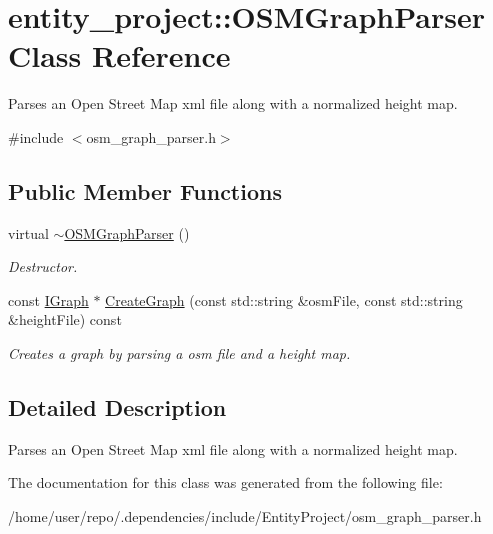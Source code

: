 \hypertarget{classentity__project_1_1OSMGraphParser}{}\section{entity\+\_\+project\+:\+:O\+S\+M\+Graph\+Parser Class Reference}
\label{classentity__project_1_1OSMGraphParser}


Parses an Open Street Map xml file along with a normalized height map.  




{\ttfamily \#include $<$osm\+\_\+graph\+\_\+parser.\+h$>$}

\subsection*{Public Member Functions}
\begin{DoxyCompactItemize}
\item 
\mbox{\label{classentity__project_1_1OSMGraphParser_a519d54d311ace383d8a75b285237cf4d}} 
virtual \hyperlink{classentity__project_1_1OSMGraphParser_a519d54d311ace383d8a75b285237cf4d}{$\sim$\+O\+S\+M\+Graph\+Parser} ()
\begin{DoxyCompactList}\small\item\em Destructor. \end{DoxyCompactList}\item 
\mbox{\label{classentity__project_1_1OSMGraphParser_a7bafd7f4d7826e00677dfc07aa04aee3}} 
const \hyperlink{classentity__project_1_1IGraph}{I\+Graph} $\ast$ \hyperlink{classentity__project_1_1OSMGraphParser_a7bafd7f4d7826e00677dfc07aa04aee3}{Create\+Graph} (const std\+::string \&osm\+File, const std\+::string \&height\+File) const
\begin{DoxyCompactList}\small\item\em Creates a graph by parsing a osm file and a height map. \end{DoxyCompactList}\end{DoxyCompactItemize}


\subsection{Detailed Description}
Parses an Open Street Map xml file along with a normalized height map. 

The documentation for this class was generated from the following file\+:\begin{DoxyCompactItemize}
\item 
/home/user/repo/.\+dependencies/include/\+Entity\+Project/osm\+\_\+graph\+\_\+parser.\+h\end{DoxyCompactItemize}
